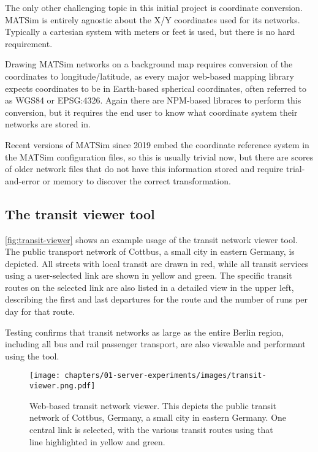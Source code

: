 The only other challenging topic in this initial project is coordinate conversion. MATSim is entirely agnostic about the X/Y coordinates used for its networks. Typically a cartesian system with meters or feet is used, but there is no hard requirement.

Drawing MATSim networks on a background map requires conversion of the coordinates to longitude/latitude, as every major web-based mapping library expects coordinates to be in Earth-based spherical coordinates, often referred to as WGS84 or EPSG:4326. Again there are NPM-based librares to perform this conversion, but it requires the end user to know what coordinate system their networks are stored in.

Recent versions of MATSim since 2019 embed the coordinate reference system in the MATSim configuration files, so this is usually trivial now, but there are scores of older network files that do not have this information stored and require trial-and-error or memory to discover the correct transformation.

\hypertarget{server-experiments-transit-result}{%
\subsection{The transit viewer tool}
\label{server-experiments-tool-transit}}

\autoref{fig:transit-viewer} shows an example usage of the transit network viewer tool. The public transport network of Cottbus, a small city in eastern Germany, is depicted. All streets with local transit are drawn in red, while all transit services using a user-selected link are shown in yellow and green. The specific transit routes on the selected link are also listed in a detailed view in the upper left, describing the first and last departures for the route and the number of runs per day for that route.

Testing confirms that transit networks as large as the entire Berlin region, including all bus and rail passenger transport, are also viewable and performant using the tool.

\begin{figure}[!ht]
  \texttt{[image: chapters/01-server-experiments/images/transit-viewer.png.pdf]}
  \caption{Web-based transit network viewer. This depicts the public transit network of Cottbus, Germany, a small city in eastern Germany. One central link is selected, with the various transit routes using that line highlighted in yellow and green.}
  \label{fig:transit-viewer}
\end{figure}

